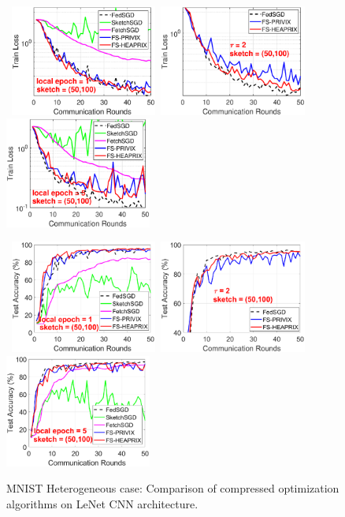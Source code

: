 \documentclass{article} %
\begin{document}
\begin{figure}[h]
\begin{center}
		\mbox{%
		\includegraphics[width=1.9in]{MNIST_figures/local1_sketch50_iid0_train_loss.eps}%
		\includegraphics[width=1.9in]{MNIST_figures/local2_sketch50_iid0_train_loss.eps}%
		\includegraphics[width=1.9in]{MNIST_figures/local5_sketch50_iid0_train_loss.eps}}
		
		\mbox{%
		\includegraphics[width=1.9in]{MNIST_figures/local1_sketch50_iid0_test_acc.eps}%
		\includegraphics[width=1.9in]{MNIST_figures/local2_sketch50_iid0_test_acc.eps} %
		\includegraphics[width=1.9in]{MNIST_figures/local5_sketch50_iid0_test_acc.eps}
		}
	\end{center}
	\caption{MNIST Heterogeneous case: Comparison of compressed optimization algorithms on LeNet CNN architecture.}
    \label{fig:MNIST-iid0-app}
\end{figure}
\end{document}
